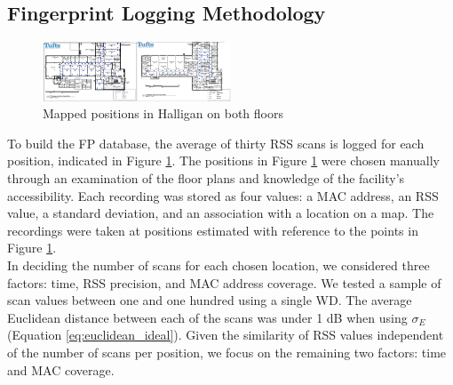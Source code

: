 \documentclass[conference]{IEEEtran}
\begin{document}
\subsection{Fingerprint Logging Methodology}

\begin{figure}[h!] 
  \centering
    \includegraphics[width=0.5\textwidth]{floorImage.png}
     \caption{Mapped positions in Halligan on both floors}
     \label{fig:mapped_positions}
\end{figure}



To build the FP database, the average of thirty RSS scans is logged for each position, indicated in Figure \ref{fig:mapped_positions}. The positions in Figure \ref{fig:mapped_positions} were chosen manually through an examination of the floor plans and knowledge of the facility's accessibility. Each recording was stored as four values: a MAC address, an RSS value, a standard deviation, and an association with a location on a map. The recordings were taken at positions estimated with reference to the points in Figure \ref{fig:mapped_positions}.\\
\indent In deciding the number of scans for each chosen location, we considered three factors: time, RSS precision, and MAC address coverage. We tested a sample of scan values between one and one hundred using a single WD. The average Euclidean distance between each of the scans was under 1 dB when using $\sigma_E$ (Equation \ref{eq:euclidean_ideal}). Given the similarity of RSS values independent of the number of scans per position, we focus on the remaining two factors: time and MAC coverage. \\


\begin{table}[!t]
\renewcommand{\arraystretch}{1.3}
\caption{Floor Recording Times (average 1.5 sec/scan)}
\label{tab:table_floor_times}
\centering
{}
\end{table}
\end{document}
